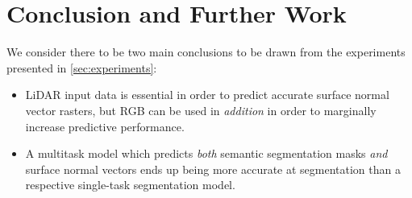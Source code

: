 \chapter{Conclusion and Further Work}

We consider there to be two main conclusions to be drawn from the experiments presented in \cref{sec:experiments}:
\begin{itemize}
  \item LiDAR input data is essential in order to predict accurate surface normal vector rasters, but RGB can be used in \emph{addition} in order to marginally increase predictive performance.
  \item A multitask model which predicts \emph{both} semantic segmentation masks \emph{and} surface normal vectors ends up being more accurate at segmentation than a respective single-task segmentation model.
\end{itemize}

